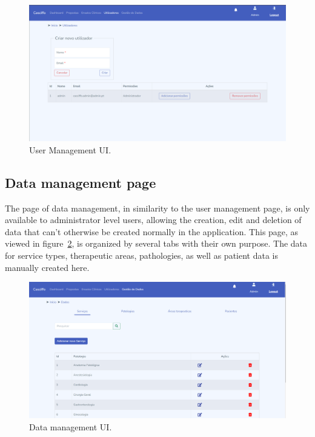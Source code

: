 \begin{figure}[H]
    \centering
    \includegraphics[scale=0.4]{Chapters/img/ui/user-management.png}
    \caption{User Management UI.}
    \label{fig:user-management-ui}
\end{figure}

\subsection{Data management page}
The page of data management, in similarity to the user management page, is only available to administrator level users, allowing the creation, edit and deletion of data that can't otherwise be created normally in the application.
This page, as viewed in figure~\ref{fig:data-management-ui}, is organized by several tabs with their own purpose. The data for service types, therapeutic areas, pathologies, as well as patient data is manually created here.

\begin{figure}[H]
    \centering
    \includegraphics[scale=0.4]{Chapters/img/ui/data-management.png}
    \caption{Data management UI.}
    \label{fig:data-management-ui}
\end{figure}



